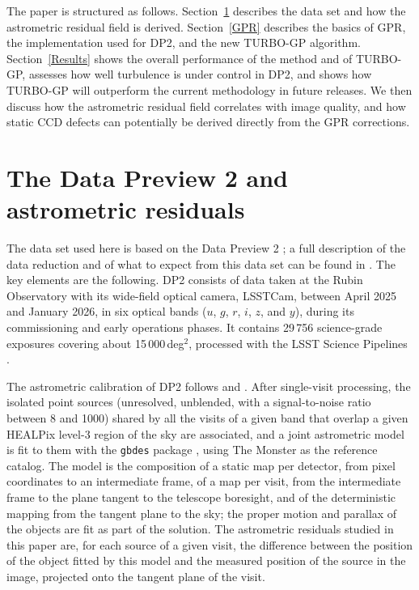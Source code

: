 The paper is structured as follows.
Section~\ref{dataAndAstrometry} describes the data set and how the astrometric residual field is derived.
Section~\ref{GPR} describes the basics of GPR, the  implementation used for DP2, and the new TURBO-GP algorithm.
Section~\ref{Results} shows the overall performance of the  method and of TURBO-GP, assesses how well turbulence is under control in DP2, 
and shows how TURBO-GP will outperform the current methodology in future releases.
We then discuss how the astrometric residual field correlates with image quality, and how static CCD defects can 
potentially be derived directly from the GPR corrections.

\section{The Data Preview 2 and astrometric residuals}
\label{dataAndAstrometry}

The data set used here is based on the Data Preview 2 \citep[DP2;][]{10.71929/rubin/3382528}; a full description of the data reduction and of 
what to expect from this data set can be found in \citet{RTN-115}.
The key elements are the following.
DP2 consists of data taken at the Rubin Observatory with its wide-field optical camera, LSSTCam, between April 2025 and January 2026, 
in six optical bands ($u$, $g$, $r$, $i$, $z$, and $y$), during its commissioning and early operations phases.
It contains 29\,756 science-grade exposures covering about 15\,000\,deg$^2$, processed with the LSST Science Pipelines \citep{PSTN-019}.

The astrometric calibration of DP2 follows  and \cite{DMTN-324}.
After single-visit processing, the isolated point sources (unresolved, unblended, with a signal-to-noise ratio between 8 and 1000) shared by all 
the visits of a given band that overlap a given HEALPix level-3 region of the sky are associated, and a joint astrometric model is fit to them 
with the \texttt{gbdes} package \citep{2022ascl.soft10011B}, using The Monster \citep{DMTN-277} as the reference catalog.
The model is the composition of a static map per detector, from pixel coordinates to an intermediate frame, of a map per visit, from the 
intermediate frame to the plane tangent to the telescope boresight, and of the deterministic mapping from the tangent plane to the sky; 
the proper motion and parallax of the objects are fit as part of the solution.
The astrometric residuals studied in this paper are, for each source of a given visit, the difference between the position of the 
object fitted by this model and the measured position of the source in the image, projected onto the tangent plane of the visit.

